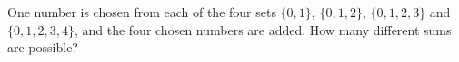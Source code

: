 One number is chosen from each of the four sets $\{0,1\}$, $\{0,1,2\}$, $\{0,1,2,3\}$ and $\{0,1,2,3,4\}$, and the four chosen numbers are added. How many different sums are possible?
